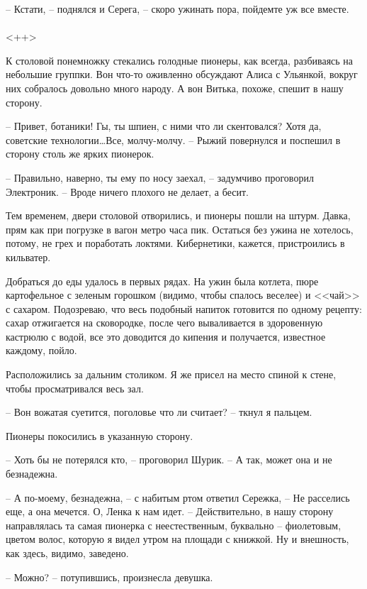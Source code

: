\documentclass[a4paper]{book}
\begin{document}
-- Кстати, -- поднялся и Серега, -- скоро ужинать пора, пойдемте уж все вместе.

\paragraph{}<++>


К столовой понемножку стекались голодные пионеры, как всегда, разбиваясь на небольшие группки. Вон что-то оживленно обсуждают Алиса с Ульянкой, вокруг них собралось довольно много народу. А вон Витька, похоже, спешит в нашу сторону.

-- Привет, ботаники! Гы, ты шпиен, с ними что ли скентовался? Хотя да, советские технологии\ldots Все, молчу-молчу. -- Рыжий повернулся и поспешил в сторону столь же ярких пионерок.

-- Правильно, наверно, ты ему по носу заехал, -- задумчиво проговорил Электроник. -- Вроде ничего плохого не делает, а бесит.

Тем временем, двери столовой отворились, и пионеры пошли на штурм. Давка, прям как при погрузке в вагон метро часа пик. Остаться без ужина не хотелось, потому, не грех и поработать локтями. Кибернетики, кажется, пристроились в кильватер. 

Добраться до еды удалось в первых рядах. На ужин была котлета, пюре картофельное с зеленым горошком (видимо, чтобы спалось веселее) и <<чай>> с сахаром. Подозреваю, что весь подобный напиток готовится по одному рецепту: сахар  отжигается на сковородке, после чего вываливается в здоровенную кастрюлю с водой, все это доводится до кипения и получается, известное каждому, пойло.

Расположились за дальним столиком. Я же присел на место спиной к стене, чтобы просматривался весь зал. 

-- Вон вожатая суетится, поголовье что ли считает? -- ткнул я пальцем. 

Пионеры покосились в указанную сторону. 

-- Хоть бы не потерялся кто, -- проговорил Шурик. -- А так, может она и не безнадежна.

-- А по-моему, безнадежна, -- с набитым ртом ответил Сережка, -- Не расселись еще, а она мечется. О, Ленка к нам идет. -- Действительно, в нашу сторону направлялась та самая пионерка с неестественным, буквально -- фиолетовым, цветом волос, которую я видел утром на площади с книжкой. Ну и внешность, как здесь, видимо, заведено.

-- Можно? -- потупившись, произнесла девушка. 
\end{document}
